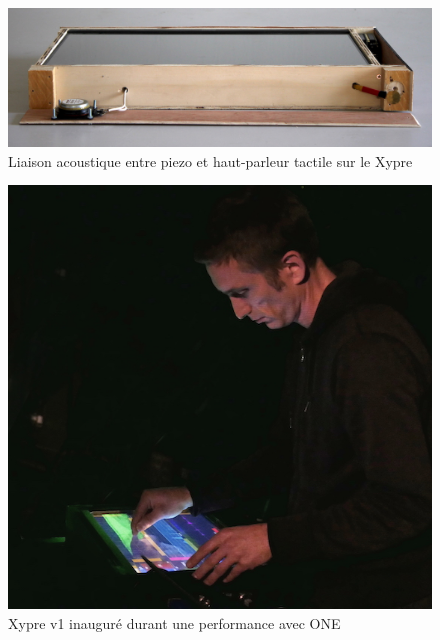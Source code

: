 \begin{figure}[!htbp]
	\captionsetup{format=plain}%
	\includegraphics[width=\textwidth]{gfx/05_interfaces/Xypre_FrontPanel_144dpi.jpg}
	\caption{Liaison acoustique entre piezo et haut-parleur tactile sur le Xypre}
	\label{fig:interface:xypre_v2-hppiezo}
\end{figure}


\begin{figure}[!htbp]
	\captionsetup{format=plain}%
	\includegraphics[width=\textwidth]{gfx/05_interfaces/xypre-v1_72dpi.jpg}
	\caption{Xypre v1 inauguré durant une performance avec ONE}
	\label{fig:interface:xyprev1_jeu}
\end{figure}


